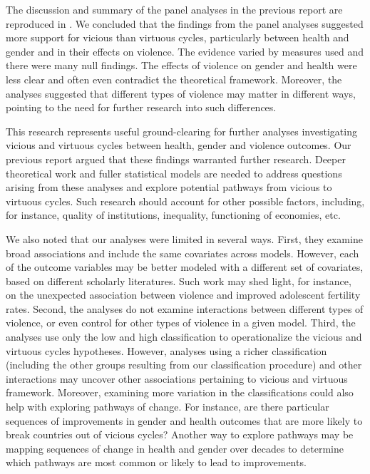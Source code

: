 \documentclass[12pt]{article}
\begin{document}
The discussion and summary of the panel analyses in the previous report are reproduced in .
We concluded that the findings from the panel analyses suggested more support for vicious than virtuous cycles, particularly between health and gender and in their effects on violence. The evidence varied by measures used and there were many null findings. The effects of violence on gender and health were less clear and often even contradict the theoretical framework. Moreover, the analyses suggested that different types of violence may matter in different ways, pointing to the need for further research into such differences.

This research represents useful ground-clearing for further analyses investigating vicious and virtuous cycles between health, gender and violence outcomes. Our previous report argued that these findings warranted further research.
Deeper theoretical work and fuller statistical models are needed to address questions arising from these analyses and explore potential pathways from vicious to virtuous cycles. Such research should account for other possible factors, including, for instance, quality of institutions, inequality, functioning of economies, etc.

We also noted that our analyses were limited in several ways.
First, they examine broad associations and include the same covariates across models.
However, each of the outcome variables may be better modeled with a different set of covariates, based on different scholarly literatures.
Such work may shed light, for instance, on the unexpected association between violence and improved adolescent fertility rates.
Second, the analyses do not examine interactions between different types of violence, or even control for other types of violence in a given model.
Third, the analyses use only the low and high classification to operationalize the vicious and virtuous cycles hypotheses.
However, analyses using a richer classification (including the other groups resulting from our classification procedure) and other interactions may uncover other associations pertaining to vicious and virtuous framework.
Moreover, examining more variation in the classifications could also help with exploring pathways of change. For instance, are there particular sequences of improvements in gender and health outcomes that are more likely to break countries out of vicious cycles?
Another way to explore pathways may be mapping sequences of change in health and gender over decades to determine which pathways are most common or likely to lead to improvements.
\end{document}
